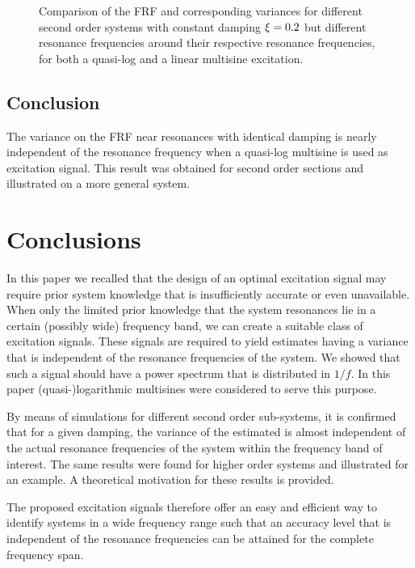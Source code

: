 \begin{figure}%
  \centering
  \setlength{\figurewidth}{0.8\columnwidth}
  \setlength{\figureheight}{5cm}
  
  \caption{Comparison of the FRF and corresponding variances for
           different second order systems with constant damping
           $\xi=0.2$ but different resonance frequencies around
           their respective resonance frequencies, for both a quasi-log 
           and a linear multisine excitation.}%
  \label{fig:damping02}
\end{figure}

\subsection{Conclusion}
The variance on the FRF near resonances with identical damping is nearly independent of the resonance frequency when a quasi-log multisine is used as excitation signal. 
This result was obtained for second order sections and illustrated on a more general system.

\section{Conclusions}\label{sec:conclusions}
In this paper we recalled that the design of an optimal excitation signal may require prior system knowledge that is insufficiently accurate or even unavailable. 
When only the limited prior knowledge that the system resonances lie in a certain (possibly wide) frequency band, we can create a suitable class of excitation signals. 
These signals are required to yield estimates having a variance that is independent of the resonance frequencies of the system. 
We showed that such a signal should have a power spectrum that is distributed in $1/f$.
In this paper (quasi-)logarithmic multisines were considered to serve this purpose.

By means of simulations for different second order sub-systems, it is confirmed that for a given damping, the variance of the estimated is almost independent of the actual resonance frequencies of the system within the frequency band of interest.
The same results were found for higher order systems and illustrated for an example. 
A theoretical motivation for these results is provided.

The proposed excitation signals therefore offer an easy and efficient way to identify systems in a wide frequency range such that an accuracy level that is independent of the resonance frequencies can be attained for the complete frequency span.
